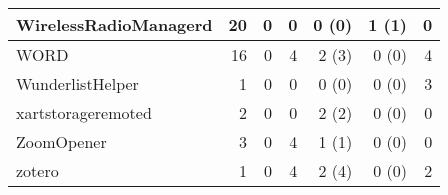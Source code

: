 \begin{adjustwidth}{-2in}{}
\begin{scriptsize}
\begin{longtable}[l]{ l | r | r | r | r | r | r }
    WirelessRadioManagerd & 20 &  0 &  0 &  0 (0) &  1 (1) &  0 \\ \hline
    WORD &  16 &  0 &  4 &  2 (3) &  0 (0) &  4 \\ \hline
    WunderlistHelper & 1 &  0 &  0 &  0 (0) &  0 (0) &  3 \\ \hline
    xartstorageremoted & 2 &  0 &  0 &  2 (2) &  0 (0) &  0 \\ \hline
    ZoomOpener & 3 &  0 &  4 &  1 (1) &  0 (0) &  0 \\ \hline
    zotero & 1 &  0 &  4 &  2 (4) &  0 (0) &  2 \\ \hline
    
     
\end{longtable}
\end{scriptsize}
\end{adjustwidth}